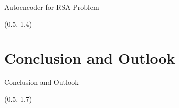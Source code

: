 \documentclass[english,aspectratio=169,dvipsnames]{beamer}
\begin{document}
\begin{frame}{Autoencoder for RSA Problem}{}
    \begin{textblock}{5}(0.5, 1.4)
        
    \end{textblock}
\end{frame}


%         

%         

\section{Conclusion and Outlook}

\begin{frame}{Conclusion and Outlook}
    \begin{textblock}{5}(0.5, 1.7)
        
    \end{textblock}
\end{frame}



\end{document}
